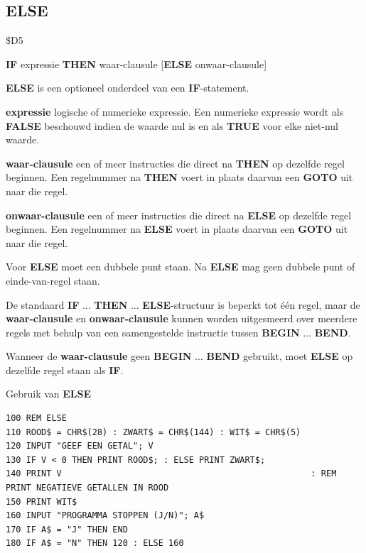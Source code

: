 \subsection{ELSE}
\begin{description}[leftmargin=2cm,style=nextline]
\item [Token:]    \$D5

\item [Formaat:]   {\bf IF} expressie {\bf THEN} waar-clausule [{\bf ELSE} onwaar-clausule]

\item [Gebruik:]    {\bf ELSE} is een optioneel onderdeel van een {\bf IF}-statement.

{\bf expressie} logische of numerieke expressie. Een numerieke expressie wordt als {\bf FALSE} beschouwd indien de waarde nul is en als {\bf TRUE} voor elke niet-nul waarde.

                  {\bf waar-clausule} een of meer instructies die direct na {\bf THEN} op dezelfde regel beginnen. Een regelnummer na {\bf THEN} voert in plaats daarvan een {\bf GOTO} uit naar die regel.

                  {\bf onwaar-clausule} een of meer instructies die direct na {\bf ELSE} op dezelfde regel beginnen. Een regelnummer na {\bf ELSE} voert in plaats daarvan een {\bf GOTO} uit naar die regel.

\item [Opmerkingen:]  Voor {\bf ELSE} moet een dubbele punt staan. Na {\bf ELSE} mag geen dubbele punt of einde-van-regel staan.

                  De standaard {\bf IF} ... {\bf THEN} ... {\bf ELSE}-structuur is beperkt tot één regel, maar de {\bf waar-clausule} en {\bf onwaar-clausule} kunnen worden uitgesmeerd over meerdere regels met behulp van een samengestelde instructie tussen {\bf BEGIN} ... {\bf BEND}.

                  Wanneer de {\bf waar-clausule} geen {\bf BEGIN} ... {\bf BEND} gebruikt, moet {\bf ELSE} op dezelfde regel staan als {\bf IF}.

\item [Voorbeelden:] Gebruik van {\bf ELSE}

\begin{tcolorbox}[colback=black,coltext=white]
\verbatimfont{\codefont}
\begin{verbatim}
100 REM ELSE
110 ROOD$ = CHR$(28) : ZWART$ = CHR$(144) : WIT$ = CHR$(5)
120 INPUT "GEEF EEN GETAL"; V
130 IF V < 0 THEN PRINT ROOD$; : ELSE PRINT ZWART$;
140 PRINT V                                                 : REM PRINT NEGATIEVE GETALLEN IN ROOD
150 PRINT WIT$
160 INPUT "PROGRAMMA STOPPEN (J/N)"; A$
170 IF A$ = "J" THEN END
180 IF A$ = "N" THEN 120 : ELSE 160
\end{verbatim}
\end{tcolorbox}


\end{description}
